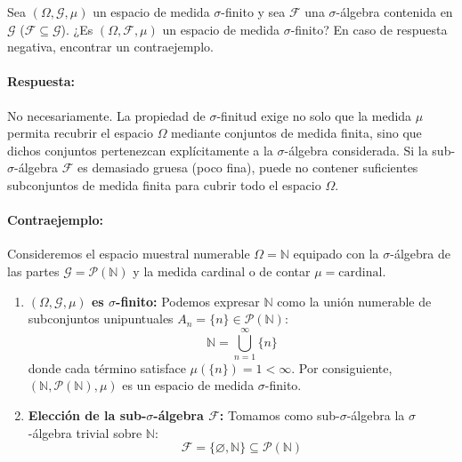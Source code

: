 \newpage
\begin{problema}
Sea $(\Omega, \mathcal{G}, \mu)$ un espacio de medida $\sigma$-finito y sea $\mathcal{F}$ una $\sigma$-álgebra contenida en $\mathcal{G}$ ($\mathcal{F} \subseteq \mathcal{G}$). ¿Es $(\Omega, \mathcal{F}, \mu)$ un espacio de medida $\sigma$-finito? En caso de respuesta negativa, encontrar un contraejemplo.

\tcblower

\paragraph{Respuesta:}
No necesariamente. La propiedad de $\sigma$-finitud exige no solo que la medida $\mu$ permita recubrir el espacio $\Omega$ mediante conjuntos de medida finita, sino que dichos conjuntos pertenezcan explícitamente a la $\sigma$-álgebra considerada. Si la sub-$\sigma$-álgebra $\mathcal{F}$ es demasiado gruesa (poco fina), puede no contener suficientes subconjuntos de medida finita para cubrir todo el espacio $\Omega$.

\paragraph{Contraejemplo:}
Consideremos el espacio muestral numerable $\Omega = \mathbb{N}$ equipado con la $\sigma$-álgebra de las partes $\mathcal{G} = \mathcal{P}(\mathbb{N})$ y la medida cardinal o de contar $\mu = \text{cardinal}$.

\begin{enumerate}
    \item \textbf{$(\Omega, \mathcal{G}, \mu)$ es $\sigma$-finito:}
    Podemos expresar $\mathbb{N}$ como la unión numerable de subconjuntos unipuntuales $A_n = \{n\} \in \mathcal{P}(\mathbb{N})$:
    \[
        \mathbb{N} = \bigcup_{n=1}^\infty \{n\}
    \]
    donde cada término satisface $\mu(\{n\}) = 1 < \infty$. Por consiguiente, $(\mathbb{N}, \mathcal{P}(\mathbb{N}), \mu)$ es un espacio de medida $\sigma$-finito.

    \item \textbf{Elección de la sub-$\sigma$-álgebra $\mathcal{F}$:}
    Tomamos como sub-$\sigma$-álgebra la $\sigma$-álgebra trivial sobre $\mathbb{N}$:
    \[
        \mathcal{F} = \{\varnothing, \mathbb{N}\} \subseteq \mathcal{P}(\mathbb{N})
    \]
    

\end{enumerate}
\end{problema}
